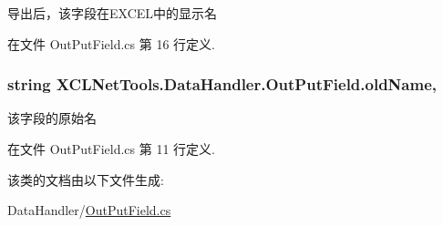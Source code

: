 导出后，该字段在\-E\-X\-C\-E\-L中的显示名 



在文件 Out\-Put\-Field.\-cs 第 16 行定义.

\hypertarget{class_x_c_l_net_tools_1_1_data_handler_1_1_out_put_field_a6d43eedd53c9281dec699a79d443c3b3}{
\subsubsection[{old\-Name}]{\setlength{\rightskip}{0pt plus 5cm}string X\-C\-L\-Net\-Tools.\-Data\-Handler.\-Out\-Put\-Field.\-old\-Name\hspace{0.3cm}{\ttfamily [get]}, {\ttfamily [set]}}}\label{class_x_c_l_net_tools_1_1_data_handler_1_1_out_put_field_a6d43eedd53c9281dec699a79d443c3b3}


该字段的原始名 



在文件 Out\-Put\-Field.\-cs 第 11 行定义.



该类的文档由以下文件生成\-:\begin{DoxyCompactItemize}
\item 
Data\-Handler/\hyperlink{_out_put_field_8cs}{Out\-Put\-Field.\-cs}\end{DoxyCompactItemize}
